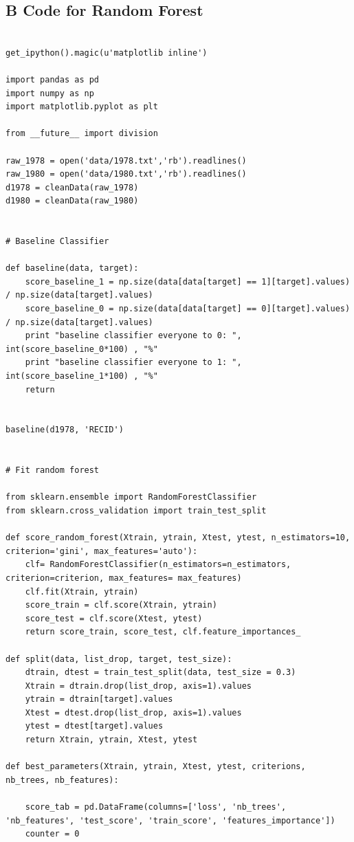 \documentclass[a4paper]{article}
\theoremstyle{plain}
\begin{document}
\subsection*{B Code for Random Forest}

\begin{lstlisting}

get_ipython().magic(u'matplotlib inline')

import pandas as pd
import numpy as np
import matplotlib.pyplot as plt

from __future__ import division

raw_1978 = open('data/1978.txt','rb').readlines()
raw_1980 = open('data/1980.txt','rb').readlines()
d1978 = cleanData(raw_1978)
d1980 = cleanData(raw_1980)


# Baseline Classifier

def baseline(data, target):
    score_baseline_1 = np.size(data[data[target] == 1][target].values) / np.size(data[target].values)
    score_baseline_0 = np.size(data[data[target] == 0][target].values) / np.size(data[target].values)
    print "baseline classifier everyone to 0: ", int(score_baseline_0*100) , "%"
    print "baseline classifier everyone to 1: ", int(score_baseline_1*100) , "%"
    return


baseline(d1978, 'RECID')


# Fit random forest

from sklearn.ensemble import RandomForestClassifier
from sklearn.cross_validation import train_test_split

def score_random_forest(Xtrain, ytrain, Xtest, ytest, n_estimators=10, criterion='gini', max_features='auto'):
    clf= RandomForestClassifier(n_estimators=n_estimators, criterion=criterion, max_features= max_features)
    clf.fit(Xtrain, ytrain)
    score_train = clf.score(Xtrain, ytrain)
    score_test = clf.score(Xtest, ytest)
    return score_train, score_test, clf.feature_importances_

def split(data, list_drop, target, test_size):
    dtrain, dtest = train_test_split(data, test_size = 0.3)
    Xtrain = dtrain.drop(list_drop, axis=1).values
    ytrain = dtrain[target].values
    Xtest = dtest.drop(list_drop, axis=1).values
    ytest = dtest[target].values
    return Xtrain, ytrain, Xtest, ytest   

def best_parameters(Xtrain, ytrain, Xtest, ytest, criterions, nb_trees, nb_features):

    score_tab = pd.DataFrame(columns=['loss', 'nb_trees', 'nb_features', 'test_score', 'train_score', 'features_importance'])
    counter = 0 


\end{lstlisting}
\end{document}
